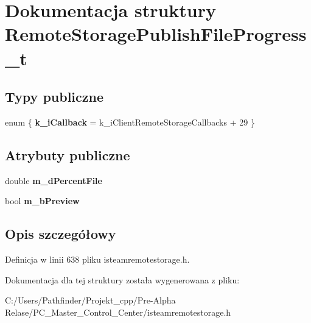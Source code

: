 \hypertarget{struct_remote_storage_publish_file_progress__t}{}\section{Dokumentacja struktury Remote\+Storage\+Publish\+File\+Progress\+\_\+t}
\label{struct_remote_storage_publish_file_progress__t}
\subsection*{Typy publiczne}
\begin{DoxyCompactItemize}
\item 
\mbox{\label{struct_remote_storage_publish_file_progress__t_a47d46e918e92c4b7aeecfc720d582a5c}} 
enum \{ {\bfseries k\+\_\+i\+Callback} = k\+\_\+i\+Client\+Remote\+Storage\+Callbacks + 29
 \}
\end{DoxyCompactItemize}
\subsection*{Atrybuty publiczne}
\begin{DoxyCompactItemize}
\item 
\mbox{\label{struct_remote_storage_publish_file_progress__t_ae5455cab84817b59caf010535f7b1cb5}} 
double {\bfseries m\+\_\+d\+Percent\+File}
\item 
\mbox{\label{struct_remote_storage_publish_file_progress__t_a9544e05f7b92c51fa0e6efa84dccec6d}} 
bool {\bfseries m\+\_\+b\+Preview}
\end{DoxyCompactItemize}


\subsection{Opis szczegółowy}


Definicja w linii 638 pliku isteamremotestorage.\+h.



Dokumentacja dla tej struktury została wygenerowana z pliku\+:\begin{DoxyCompactItemize}
\item 
C\+:/\+Users/\+Pathfinder/\+Projekt\+\_\+cpp/\+Pre-\/\+Alpha Relase/\+P\+C\+\_\+\+Master\+\_\+\+Control\+\_\+\+Center/isteamremotestorage.\+h\end{DoxyCompactItemize}
